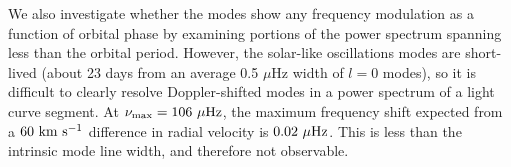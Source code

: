 We also investigate whether the modes show any frequency modulation as a function of orbital phase by examining portions of the power spectrum spanning less than the orbital period. However, the solar-like oscillations modes are short-lived (about 23 days from an average 0.5 $\mu$Hz width of $l=0$ modes), so it is difficult to clearly resolve Doppler-shifted modes in a power spectrum of a light curve segment. At $\nu_{\rm{max}} = 106 \ \mu \rm{Hz}$, the maximum frequency shift expected from a $60 \ \rm{km} \ \rm{s}^{-1}$ difference in radial velocity is $0.02 \ \mu \rm{Hz}$. This is less than the intrinsic mode line width, and therefore not observable.
